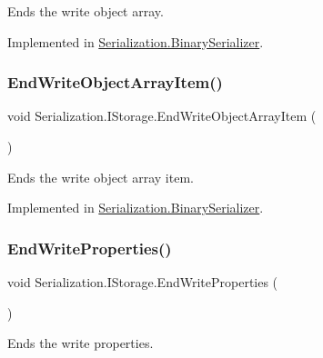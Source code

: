 Ends the write object array. 



Implemented in \hyperlink{class_serialization_1_1_binary_serializer_acc36437ec400bb791655857fa98cfd40}{Serialization.\+Binary\+Serializer}.

\mbox{\label{interface_serialization_1_1_i_storage_a0cde5cf5cf0ba7a6a229213330619a49}} 
\subsubsection{\texorpdfstring{End\+Write\+Object\+Array\+Item()}{EndWriteObjectArrayItem()}}
{\footnotesize\ttfamily void Serialization.\+I\+Storage.\+End\+Write\+Object\+Array\+Item (\begin{DoxyParamCaption}{ }\end{DoxyParamCaption})}



Ends the write object array item. 



Implemented in \hyperlink{class_serialization_1_1_binary_serializer_a690c73b90c4f755f4ae1b87fa70eda67}{Serialization.\+Binary\+Serializer}.

\mbox{\label{interface_serialization_1_1_i_storage_ad922a8b40756c84f00aa6afd75b93735}} 
\subsubsection{\texorpdfstring{End\+Write\+Properties()}{EndWriteProperties()}}
{\footnotesize\ttfamily void Serialization.\+I\+Storage.\+End\+Write\+Properties (\begin{DoxyParamCaption}{ }\end{DoxyParamCaption})}



Ends the write properties. 



